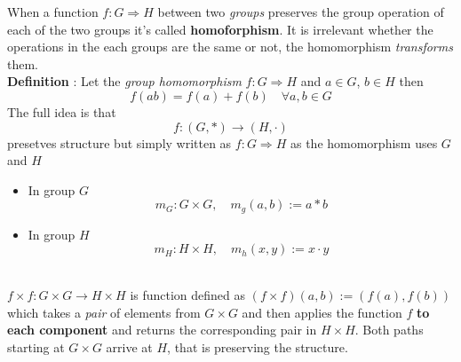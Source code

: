 \documentclass[12pt]{article}
\begin{document}
When a function $f:G \Rightarrow H$ between two \textit{groups} preserves the group operation of each of the two groups it's called \textbf{homoforphism}.
It is irrelevant whether the operations in the each  groups are the same or not, the homomorphism \textit{transforms} them.
\\
\textbf{Definition} : Let the \textit{group homomorphism} $f:G \Rightarrow H$ and $a \in G$, $b \in H$ then
$$f(ab)=f(a)+f(b) \quad \forall a,b \in G$$
The full idea is that 
$$f:(G,*) \rightarrow (H,\cdot)$$
presetves structure but simply written as $f:G \Rightarrow H$ as the homomorphism uses $G$ and $H$
\begin{itemize}
	\item In group $G$
	$$m_G : G \times G, \quad m_g(a,b) := a*b$$
	\item In group $H$
	$$m_H : H \times H, \quad m_h(x,y) := x \cdot y$$
\end{itemize}
\vspace{1cm}
$$

$$
\vspace{1cm} \\
$f \times f : G \times G \rightarrow H \times H$ is function defined as $(f \times f)(a,b) := (f(a),f(b))$ which takes a \textit{pair} of elements from $G \times G$ and then applies the function $f$ \textbf{to each component} and returns the corresponding pair in $H \times H$. Both paths starting at $G \times G$ arrive at $H$, that is preserving the structure.
\end{document}
